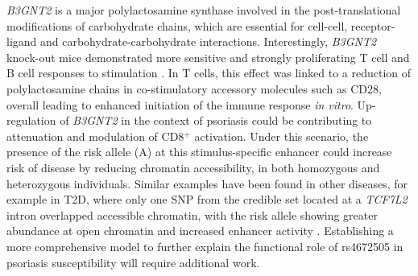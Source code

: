  \textit{B3GNT2} is a major polylactosamine synthase involved in the post-translational modifications of carbohydrate chains, which are essential for cell-cell, receptor-ligand and carbohydrate-carbohydrate interactions. Interestingly, \textit{B3GNT2} knock-out mice demonstrated more sensitive  and strongly proliferating T cell and B cell responses to stimulation \parencite{Togayachi2010}. In T cells, this effect was linked to a reduction of polylactosamine chains in co-stimulatory accessory molecules such as CD28, overall leading to enhanced initiation of the immune response \textit{in vitro}. Up-regulation of \textit{B3GNT2} in the context of psoriasis could be contributing to attenuation and modulation of CD8$^+$ activation. Under this scenario, the presence of the risk allele (A) at this stimulus-specific enhancer could increase risk of disease by reducing chromatin accessibility, in both homozygous and heterozygous individuals. %
Similar examples have been found in other diseases, for example in T2D, where only one SNP from the credible set located at a \textit{TCF7L2} intron overlapped accessible chromatin, with the risk allele showing greater abundance at open chromatin and increased enhancer activity \parencite{Gaulton2010, Stefan2014}. Establishing a more comprehensive model to further explain the functional role of rs4672505 in psoriasis susceptibility will require additional work.


